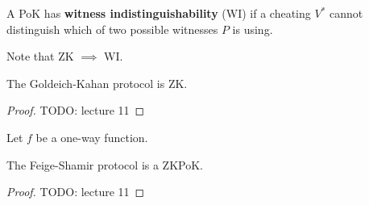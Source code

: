 \begin{defn}
A PoK has \textbf{witness indistinguishability} (WI) if a cheating $V^*$ cannot distinguish which of two possible witnesses $P$ is using.
\end{defn}

Note that ZK $\implies$ WI.

\begin{prcl}
\end{prcl}

\begin{thm}
The Goldeich-Kahan protocol is ZK.
\end{thm}
\begin{proof}
TODO: lecture 11
\end{proof}

\begin{prcl}
Let $f$ be a one-way function.
\end{prcl}

\begin{thm}
The Feige-Shamir protocol is a ZKPoK.
\end{thm}
\begin{proof}
TODO: lecture 11
\end{proof}